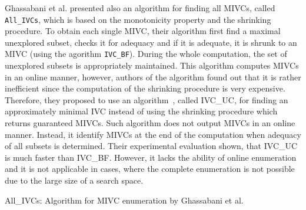 Ghassabani et al. presented also an algorithm for finding all MIVCs, called \texttt{All\_IVCs}, which is based on the monotonicity property and the shrinking procedure. To obtain each single MIVC, their algorithm first find a maximal unexplored subset, checks it for adequacy and if it is adequate, it is shrunk to an MIVC (using the agorithm \texttt{IVC\_BF}). During the whole computation, the set of unexplored subsets is appropriately maintained. This algorithm computes MIVCs in an online manner, however, authors of the algorithm found out that it is rather inefficient since the computation of the shrinking procedure is very expensive. Therefore, they proposed to use an algorithm~\cite{single-ivc}, called IVC\_UC, for finding an approximately minimal IVC instead of using the shrinking procedure which returns guaranteed MIVCs. Such algorithm does not output MIVCs in an online manner. Instead, it identify MIVCs at the end of the computation when adequacy of all subsets is determined. Their experimental evaluation shown, that IVC\_UC is much faster than IVC\_BF. However, it lacks the ability of online enumeration and it is not applicable in cases, where the complete enumeration is not possible due to the large size of a search space. 



\begin{algorithm}[!t]

\caption{All\_IVCs: Algorithm for MIVC enumeration by Ghassabani et al. }
\end{algorithm}


